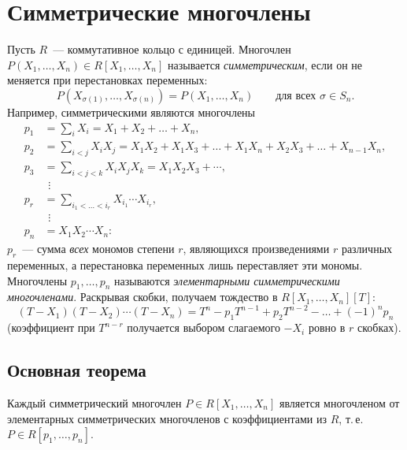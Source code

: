 \makeatletter
{}
\makeatother
\section{Симметрические многочлены}

Пусть $R$~--- коммутативное кольцо с единицей. Многочлен $P(X_1,\dots,X_n)\in R[X_1,\dots,X_n]$ называется
\emph{симметрическим}, если он не меняется при перестановках переменных:
\[
P(X_{\sigma(1)},\dots,X_{\sigma(n)})=P(X_1,\dots,X_n)\qquad\text{для всех }\sigma\in S_n .
\]
Например, симметрическими являются многочлены
\begin{align*}
p_1&=\textstyle\sum_{i}X_i=X_1+X_2+\dots+X_n,\\
p_2&=\textstyle\sum_{i<j}X_iX_j=X_1X_2+X_1X_3+\dots+X_1X_n+X_2X_3+\dots+X_{n-1}X_n,\\
p_3&=\textstyle\sum_{i<j<k}X_iX_jX_k=X_1X_2X_3+\cdots,\\
&\ \,\vdots\\
p_r&=\textstyle\sum_{i_1<\dots<i_r}X_{i_1}\cdots X_{i_r},\\
&\ \,\vdots\\
p_n&=X_1X_2\cdots X_n:
\end{align*}
$p_r$~--- сумма \emph{всех} мономов степени $r$, являющихся произведениями $r$ различных переменных, а перестановка
переменных лишь переставляет эти мономы. Многочлены $p_1,\dots,p_n$ называются \emph{элементарными симметрическими
многочленами}. Раскрывая скобки, получаем тождество в $R[X_1,\dots,X_n][T]$:
\begin{equation*}
(T-X_1)(T-X_2)\cdots(T-X_n)=T^n-p_1T^{n-1}+p_2T^{n-2}-\dots+(-1)^np_n
\end{equation*}
(коэффициент при $T^{n-r}$ получается выбором слагаемого $-X_i$ ровно в $r$ скобках).

\subsection*{Основная теорема}

\begin{theorem}
Каждый симметрический многочлен $P\in R[X_1,\dots,X_n]$ является многочленом от элементарных симметрических
многочленов с коэффициентами из $R$, т.\,е.\ $P\in R[p_1,\dots,p_n]$.
\end{theorem}

